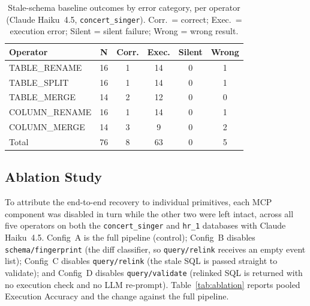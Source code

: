 \documentclass[conference,10pt,a4paper]{IEEEtran}
\begin{document}
\begin{table}[t]
\centering
\caption{Stale-schema baseline outcomes by error category, per operator
(Claude Haiku~4.5, \texttt{concert\_singer}). Corr.\ = correct;
Exec.\ = execution error; Silent = silent failure; Wrong = wrong result.}
\label{tab:erroranalysis}
\begin{tabular}{lccccc}
\toprule
\textbf{Operator} & \textbf{N} & \textbf{Corr.} & \textbf{Exec.} & \textbf{Silent} & \textbf{Wrong} \\
\midrule
TABLE\_RENAME  & 16 & 1 & 14 & 0 & 1 \\
TABLE\_SPLIT   & 16 & 1 & 14 & 0 & 1 \\
TABLE\_MERGE   & 14 & 2 & 12 & 0 & 0 \\
COLUMN\_RENAME & 16 & 1 & 14 & 0 & 1 \\
COLUMN\_MERGE  & 14 & 3 & 9  & 0 & 2 \\
\midrule
Total          & 76 & 8 & 63 & 0 & 5 \\
\bottomrule
\end{tabular}
\end{table}

\subsection{Ablation Study}

To attribute the end-to-end recovery to individual primitives, each MCP
component was disabled in turn while the other two were left intact, across
all five operators on both the \texttt{concert\_singer} and \texttt{hr\_1}
databases with Claude Haiku~4.5. Config~A is the full pipeline (control);
Config~B disables \texttt{schema/fingerprint} (the diff classifier, so
\texttt{query/relink} receives an empty event list); Config~C disables
\texttt{query/relink} (the stale SQL is passed straight to validate); and
Config~D disables \texttt{query/validate} (relinked SQL is returned with no
execution check and no LLM re-prompt). Table~\ref{tab:ablation} reports
pooled Execution Accuracy and the change against the full pipeline.
\end{document}
